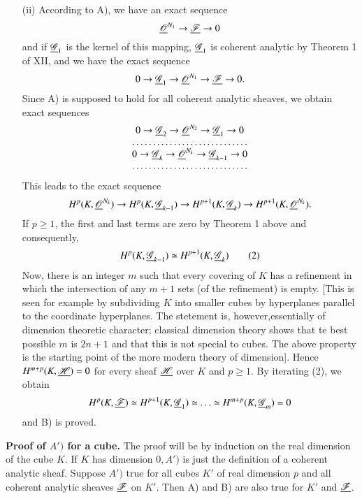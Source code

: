 \begin{step}
\begin{itemize}
\item[(ii)] According to A), we have an exact sequence
$$
\underline{\mathscr{O}}^{N_1} \to \underline{\mathscr{F}} \to 0
$$
and if $\underline{\mathscr{G}}_1$ is the kernel of this mapping,
$\underline{\mathscr{G}}_1$ is coherent analytic by Theorem 1 of XII, and we
have the exact sequence
$$
0 \to \underline{\mathscr{G}}_1 \to \underline{\mathscr{O}}^{N_1} \to \underline{\mathscr{F}}
\to 0.
$$
Since A) is supposed to hold for all coherent analytic sheaves, we
obtain exact sequences
\begin{equation*}
\begin{matrix}
0 \to \u{\mathscr{G}}_2 \to \u{\mathscr{O}}^{N_2} \to
\u{\mathscr{G}}_1 \to 0\\
\hdotsfor{1}\\
0 \to \u{\mathscr{G}}_k \to \u{\mathscr{O}}^{N_k} \to
\u{\mathscr{G}}_{k-1} \to 0 \\
\hdotsfor{1}
\end{matrix}
\end{equation*}
This leads to the exact sequence
$$
H^p (K, \underline{\mathscr{O}}^{N_k}) \to H^p (K, \underline{\mathscr{G}}_{k-1}) \to
H^{p+1} (K, \underline{\mathscr{G}}_k) \to H^{p+1} (K,
\underline{\mathscr{O}}^{N_k}). 
$$
If $p \geq 1$, the first and last terms are zero by Theorem 1 above
and consequently,
\begin{equation*}
H^p (K, \underline{\mathscr{G}}_{k-1}) \simeq H^{p+1} (K, \underline{\mathscr{G}}_k)
\tag{2} 
\end{equation*} 
Now, there is an integer $m$ such that every covering of $K$ has a
refinement in which the intersection of any $m+1$ sets (of the
refinement) is empty. [This is seen for example by subdividing $K$
  into smaller cubes by hyperplanes parallel to the coordinate
  hyperplanes. The stetement is, however,\pageoriginale essentially of
dimension theoretic character; classical dimension theory shows that
te best possible $m$ is $2n+1$ and that this is not special to
cubes. The above property is the starting point of the more modern
theory of dimension]. Hence $H^{m+p} (K, \underline{\mathscr{H}}) =0$ for
every sheaf $\underline{\mathscr{H}}$ over $K$ and $p \geq 1$. By iterating
(2), we obtain 
$$
H^p (K, \underline{\mathscr{F}}) \simeq H^{p+1} (K, \underline{\mathscr{G}}_1) \simeq
\ldots \simeq H^{m+p} (K, \underline{\mathscr{G}}_m) = 0
$$
and B) is proved. 
\end{itemize}
\end{step}


\begin{step}%
\textbf{Proof of $A')$ for a cube.}
The proof will be by induction on the real dimension of the cube
$K$. If $K$ has dimension $0, A')$ is just the definition of a
coherent analytic sheaf. Suppose $A')$ true for all cubes $K'$ of real
dimension $p$ and all coherent analytic sheaves $\underline{\mathscr{F}}$ on
$K'$. Then A) and B) are also true for $K'$ and $\underline{\mathscr{F}}$. 
\end{step}

